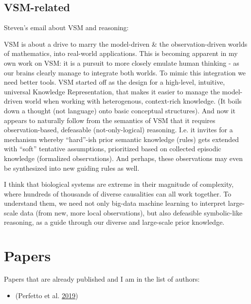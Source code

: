 \documentclass[
  12pt,
]{book}
\providecommand{\tightlist}{%
  \setlength{\itemsep}{0pt}\setlength{\parskip}{0pt}}
\begin{document}
\hypertarget{vsm-related}{%
\section{VSM-related}\label{vsm-related}}

Steven's email about VSM and reasoning:

VSM is about a drive to marry the model-driven \& the observation-driven worlds of mathematics, into real-world applications.
This is becoming apparent in my own work on VSM: it is a pursuit to more closely emulate human thinking - as our brains clearly manage to integrate both worlds.
To mimic this integration we need better tools.
VSM started off as the design for a high-level, intuitive, universal Knowledge Representation, that makes it easier to manage the model-driven world when working with heterogenous, context-rich knowledge.
(It boils down a thought (not language) onto basic conceptual structures).
And now it appears to naturally follow from the semantics of VSM that it requires observation-based, defeasable (not-only-logical) reasoning.
I.e. it invites for a mechanism whereby ``hard''-ish prior semantic knowledge (rules) gets extended with ``soft'' tentative assumptions, prioritized based on collected episodic knowledge (formalized observations).
And perhaps, these observations may even be synthesized into new guiding rules as well.

I think that biological systems are extreme in their magnitude of complexity, where hundreds of thousands of diverse causalities can all work together.
To understand them, we need not only big-data machine learning to interpret large-scale data (from new, more local observations), but also defeasible symbolic-like reasoning, as a guide through our diverse and large-scale prior knowledge.

\hypertarget{appendix-appendix}{%
\appendix}


\hypertarget{papers-1}{%
\chapter*{Papers}\label{papers-1}}

Papers that are already published and I am in the list of authors:

\begin{itemize}
\tightlist
\item
  (Perfetto et al. \protect\hyperlink{ref-Perfetto2019}{2019})
\end{itemize}
\end{document}
